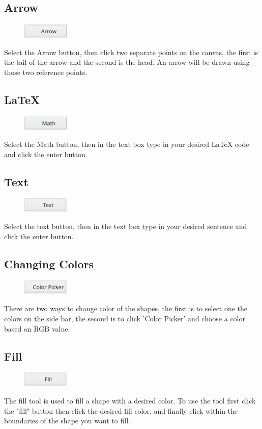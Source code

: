 \subsection{Arrow}
\begin{figure}[h!]
\includegraphics{arrow}
\end{figure}
Select the Arrow button, then click two separate points on the canvas, the first is the tail of the arrow and the second is the head. An arrow will be drawn using those two reference points.

\newpage
\subsection{LaTeX}
\begin{figure}[h!]
\includegraphics{math}
\end{figure}
Select the Math button, then in the text box type in your desired LaTeX code and click the enter button.

\subsection{Text}
\begin{figure}[h!]
\includegraphics{text}
\end{figure}
Select the text button, then in the text box type in your desired sentence and click the enter button.

\subsection{Changing Colors}
\begin{figure}[h!]
\includegraphics{cp}
\end{figure}
There are two ways to change color of the shapes, the first is to select one the colors on the side bar, the second is to click 'Color Picker' and choose a color based on RGB value.

\subsection{Fill}
\begin{figure}[h!]
\includegraphics{fill}
\end{figure}
  The fill tool is used to fill a shape with a desired color. To use the tool first click the "fill" button then click the desired fill color, and finally click within the boundaries of the shape you want to fill.
